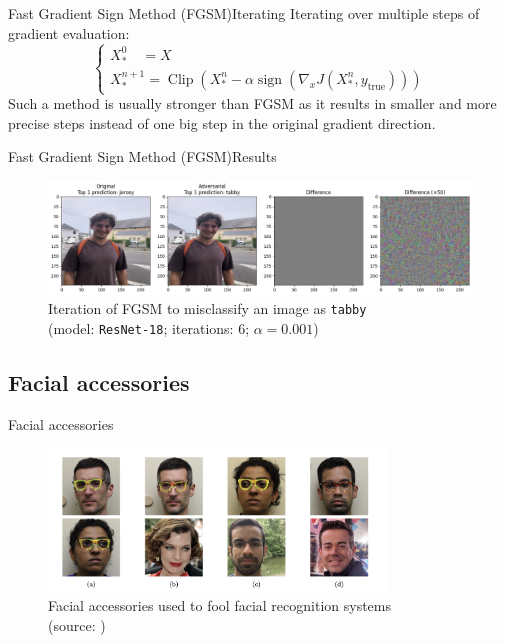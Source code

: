 \documentclass[aspectratio=169]{beamer}
\theoremstyle{definition}
\DeclareMathOperator*{\sign}{sign}
\DeclareMathOperator*{\Clip}{Clip}
\begin{document}
\begin{frame}{Fast Gradient Sign Method (FGSM)}{Iterating}
  Iterating over multiple steps of gradient evaluation:
  \begin{equation*}
    \begin{cases*}
        X_*^0 \quad= X\\
        X^{n+1}_* = \Clip\left(X^n_*-\alpha\sign\left(\nabla_x J(X^n_*, y_{\text{true}})\right)\right)
    \end{cases*}
  \end{equation*}
  Such a method is usually stronger than FGSM as it results in smaller and more precise steps instead of one big step in the original gradient direction.
\end{frame}

\begin{frame}{Fast Gradient Sign Method (FGSM)}{Results}
  \begin{figure}
    \centering
    \includegraphics[width=\textwidth]{fgsm-tabby.png}
    \caption{Iteration of FGSM to misclassify an image as \texttt{tabby}\\(model: \texttt{ResNet-18}; iterations: 6; $\alpha=0.001$)}
  \end{figure}
\end{frame}

\subsection{Facial accessories}
\begin{frame}{Facial accessories}
  \begin{figure}
    \centering
    \includegraphics[width=0.8\textwidth]{facial-accessories.png}
    \caption{Facial accessories used to fool facial recognition systems\\ (source: \cite{sharif2016accessorize})}
  \end{figure}
\end{frame}
\end{document}
